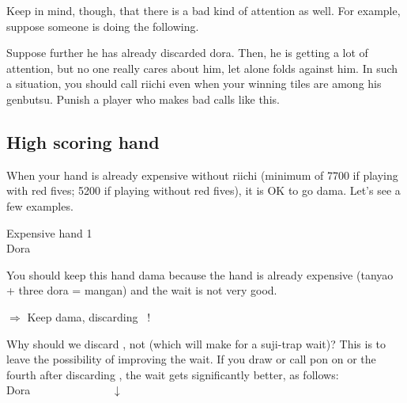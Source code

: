 \bigskip

Keep in mind, though, that there is a bad kind of attention as well. For example, suppose someone is doing the following.
\bp
{} ~\zhong\zhong\rzhong~~
\ep

\bigskip
Suppose further he has already discarded {\jap dora}. Then, he is getting a lot of attention, but no one really cares about him, let alone folds against him. In such a situation, you should call riichi even when your winning tiles are among his {\jap genbutsu}. Punish a player who makes bad calls like this.

\bigskip
\subsection{High scoring hand} \label{sec:high}
When your hand is already expensive without riichi (minimum of 7700 if playing with red fives; 5200 if playing without red fives), it is OK to go {\jap dama}. Let's see a few examples. 

\bigskip
\begin{itembox}[r]{Expensive hand 1}
\bp
{}~~\\
\hfill\footnotesize{{\jap Dora}~~~~~}
\ep
\vspace{-15pt}
\end{itembox}

\bigskip You should keep this hand {\jap dama} because the hand is already expensive ({\jap tanyao} + three {\jap dora} = {\jap mangan}) and the wait is not very good. 

\bigskip
\begin{center}
{\Large $\Rightarrow$ Keep {\jap dama}, discarding  ~!}
\end{center}

\bigskip
Why should we discard {\LARGE{}}, not {\LARGE{}} (which will make for a {\jap suji}-trap wait)? 
This is to leave the possibility of improving the wait. If you draw or call {\jap pon} on {\LARGE{}} or the fourth {\LARGE{}} after discarding {\LARGE{}}, the wait gets significantly better, as follows:
\bp
{}~~\\
\hfill\footnotesize{{\jap Dora}~~~~~~~~~~~~~~}
\ep
\bp
\vspace{-25pt}
$\downarrow$\\
 \\
\\
\ep

